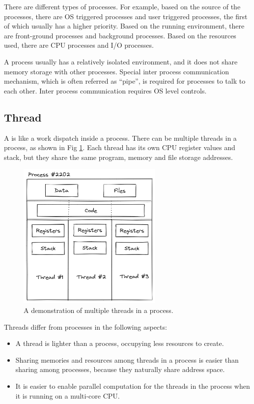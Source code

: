 There are different types of processes. For example, based on the source of the processes, there are OS triggered processes and user triggered processes, the first of which usually has a higher priority. Based on the running environment, there are front-ground processes and background processes. Based on the resources used, there are CPU processes and I/O processes.

A process usually has a relatively isolated environment, and it does not share memory storage with other processes. Special inter process communication mechanism, which is often referred as ``pipe'', is required for processes to talk to each other. Inter process communication requires OS level controls.

\subsection{Thread}

A  is like a work dispatch inside a process. There can be multiple threads in a process, as shown in Fig \ref{ch:pm:fig:threadinprocess}. Each thread has its own CPU register values and stack, but they share the same program, memory and file storage addresses.
\begin{figure}[!htb]
	\centering
	\includegraphics[width=200pt]{chapters/part-1/figures/threadinprocess.png}
	\caption{A demonstration of multiple threads in a process.} \label{ch:pm:fig:threadinprocess}
\end{figure}

Threads differ from processes in the following aspects:
\begin{itemize}
  \item A thread is lighter than a process, occupying less resources to create.
  \item Sharing memories and resources among threads in a process is easier than sharing among processes, because they naturally share address space.
  \item It is easier to enable parallel computation for the threads in the process when it is running on a multi-core CPU.
\end{itemize}

